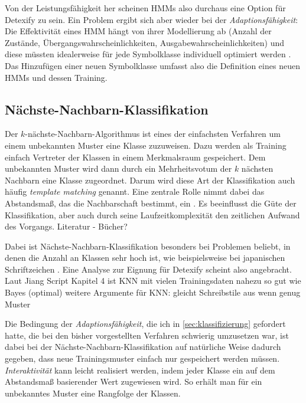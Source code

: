Von der Leistungsfähigkeit her scheinen HMMs also durchaus eine Option für Detexify zu sein. Ein Problem ergibt sich aber wieder bei der \emph{Adaptionsfähigkeit}: Die Effektivität eines HMM hängt von ihrer Modellierung ab (Anzahl der Zustände, Übergangswahrscheinlichkeiten, Ausgabewahrscheinlichkeiten) und diese müssten idealerweise für jede Symbolklasse individuell optimiert werden \cite{Fitzgerald:2005p331}. Das Hinzufügen einer neuen Symbolklasse umfasst also die Definition eines neuen HMMs und dessen Training.

\subsection{Nächste-Nachbarn-Klassifikation} \label{sub:knn}

Der $k$-nächste-Nachbarn-Algorithmus ist eines der einfachsten Verfahren um einem unbekannten Muster eine Klasse zuzuweisen. Dazu werden als Training einfach Vertreter der Klassen in einem Merkmalsraum gespeichert. Dem unbekannten Muster wird dann durch ein Mehrheitsvotum der $k$ nächsten Nachbarn eine Klasse zugeordnet. Darum wird diese Art der Klassifikation auch häufig \emph{template matching} genannt. Eine zentrale Rolle nimmt dabei das Abstandsmaß, das die Nachbarschaft bestimmt, ein \cite{Jaeger:2003p1097}. Es beeinflusst die Güte der Klassifikation, aber auch durch seine Laufzeitkomplexität den zeitlichen Aufwand des Vorgangs.
\TODO Literatur - Bücher?

Dabei ist Nächste-Nachbarn-Klassifikation besonders bei Problemen beliebt, in denen die Anzahl an Klassen sehr hoch ist, wie beispielsweise bei japanischen Schriftzeichen \cite{Jaeger:2003p1097}. Eine Analyse zur Eignung für Detexify scheint also angebracht.
\TODO Laut Jiang Script Kapitel 4 ist KNN mit vielen Trainingsdaten nahezu so gut wie Bayes (optimal)
\TODO weitere Argumente für KNN: gleicht Schreibstile aus wenn genug Muster

Die Bedingung der \emph{Adaptionsfähigkeit}, die ich in \ref{sec:klassifizierung} gefordert hatte, die bei den bisher vorgestellten Verfahren schwierig umzusetzen war, ist dabei bei der Nächste-Nachbarn-Klassifikation auf natürliche Weise dadurch gegeben, dass neue Trainingsmuster einfach nur gespeichert werden müssen. \emph{Interaktivität} kann leicht realisiert werden, indem jeder Klasse ein auf dem Abstandsmaß basierender Wert zugewiesen wird. So erhält man für ein unbekanntes Muster eine Rangfolge der Klassen.

